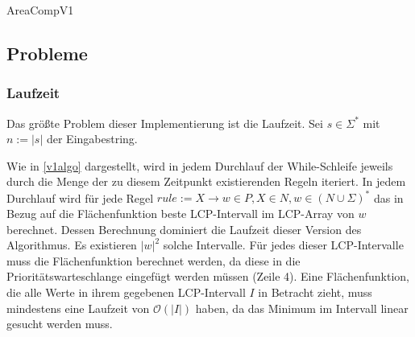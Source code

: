 \begin{algorithm}[t]
    \caption{AreaCompV1}
    \label{v1algo}
\end{algorithm}

\subsection{Probleme}

\subsubsection{Laufzeit}
\label{v1problemruntime}

Das größte Problem dieser Implementierung ist die Laufzeit. Sei $s \in \Sigma^*$ mit $n := |s|$ der Eingabestring.

Wie in \autoref{v1algo} dargestellt, wird in jedem Durchlauf der While-Schleife jeweils durch die Menge der zu diesem Zeitpunkt existierenden Regeln iteriert. 
In jedem Durchlauf wird für jede Regel $rule := X \rightarrow w \in P, X \in N, w \in (N \cup \Sigma)^*$ das in Bezug auf die Flächenfunktion beste LCP-Intervall im LCP-Array von $w$ berechnet. Dessen Berechnung dominiert die Laufzeit dieser Version des Algorithmus. 
Es existieren $|w|^2$ solche Intervalle. Für jedes dieser LCP-Intervalle muss die Flächenfunktion berechnet werden, da diese in die Prioritätswarteschlange eingefügt werden müssen (Zeile 4). Eine Flächenfunktion, die alle Werte in ihrem gegebenen LCP-Intervall $I$ in Betracht zieht, muss mindestens eine Laufzeit von $\mathcal{O}(|I|)$ haben, da das Minimum im Intervall linear gesucht werden muss.

